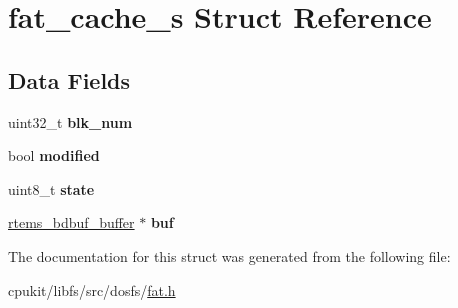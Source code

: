 \hypertarget{structfat__cache__s}{}\section{fat\+\_\+cache\+\_\+s Struct Reference}
\label{structfat__cache__s}
\subsection*{Data Fields}
\begin{DoxyCompactItemize}
\item 
\mbox{\label{structfat__cache__s_a7d94c22ffbb202629808e2170ecc0c57}} 
uint32\+\_\+t {\bfseries blk\+\_\+num}
\item 
\mbox{\label{structfat__cache__s_a8496f29fb3ff533cbd0b03b572b5595d}} 
bool {\bfseries modified}
\item 
\mbox{\label{structfat__cache__s_a74c2837d561d47bf2c50ad7eb43991ad}} 
uint8\+\_\+t {\bfseries state}
\item 
\mbox{\label{structfat__cache__s_ae59cfb5406e698c520eaa5ad636a6a3c}} 
\mbox{\hyperlink{structrtems__bdbuf__buffer}{rtems\+\_\+bdbuf\+\_\+buffer}} $\ast$ {\bfseries buf}
\end{DoxyCompactItemize}


The documentation for this struct was generated from the following file\+:\begin{DoxyCompactItemize}
\item 
cpukit/libfs/src/dosfs/\mbox{\hyperlink{fat_8h}{fat.\+h}}\end{DoxyCompactItemize}
